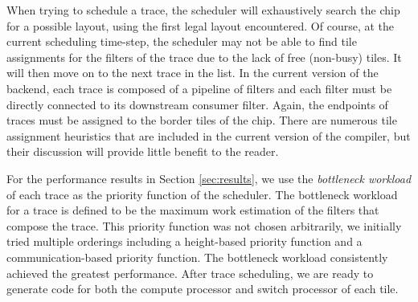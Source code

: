 When trying to schedule a trace, the scheduler will exhaustively
search the chip for a possible layout, using the first legal layout
encountered. Of course, at the current scheduling time-step, the
scheduler may not be able to find tile assignments for the filters of
the trace due to the lack of free (non-busy) tiles.  It will then move
on to the next trace in the list. In the current version of the
backend, each trace is composed of a pipeline of filters and each
filter must be directly connected to its downstream consumer filter.
Again, the endpoints of traces must be assigned to the border tiles of
the chip.  There are numerous tile assignment heuristics that are
included in the current version of the compiler, but their discussion
will provide little benefit to the reader.

For the performance results in Section \ref{sec:results}, we use the
{\it bottleneck workload} of each trace as the priority function of
the scheduler. The bottleneck workload for a trace is defined to be
the maximum work estimation of the filters that compose the trace.
This priority function was not chosen arbitrarily, we initially tried
multiple orderings including a height-based priority function and a
communication-based priority function.
The bottleneck workload consistently achieved the greatest
performance. After trace scheduling, we are ready to generate code for
both the compute processor and switch processor of each tile.
